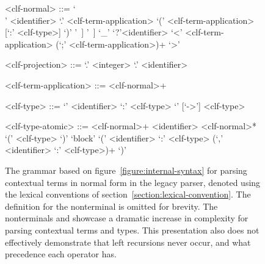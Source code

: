 \begin{figure}[H]
\begin{grammar}
<clf-normal> ::=
     `\\' <identifier> `.' <clf-term-application>
\alt `(' <clf-term-application> [`:' <clf-type>] `)'
\alt <hash-identifier> [<clf-projection>] [ `[' <clf-substitution> `]' ]
\alt <qualified-identifier> [<clf-projection>] [ `[' <clf-substitution> `]' ]
\alt `_'
\alt `?'<identifier>
\alt `<' <clf-term-application> (`;' <clf-term-application>)+ `>'

<clf-projection> ::=
     `.' <integer>
\alt `.' <identifier>

<clf-term-application> ::=
     <clf-normal>+

<clf-type> ::=
     `{' <identifier> `:' <clf-type> `}' [`->'] <clf-type>

<clf-type-atomic> ::=
     <clf-normal>+
\alt <identifier> <clf-normal>*
\alt `(' <clf-type> `)'
\alt `block' `(' <identifier> `:' <clf-type> (`,' <identifier> `:' <clf-type>)+ `)'
\end{grammar}
\caption[Grammar for parsing contextual \acs{LF} terms in normal form in the legacy \Beluga parser]{%
The grammar based on figure~\ref{figure:internal-syntax} for parsing contextual \LF terms in normal form in the legacy parser, denoted using the lexical conventions of section~\ref{section:lexical-convention}.
The definition for the nonterminal  is omitted for brevity.
The nonterminals  and  showcase a dramatic increase in complexity for parsing contextual \LF terms and types.
This presentation also does not effectively demonstrate that left recursions never occur, and what precedence each operator has.
}
\label{figure:legacy-clf-parsing}
\end{figure}

